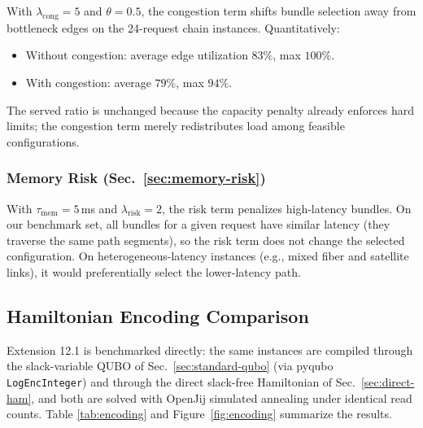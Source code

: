 \documentclass[10pt,a4paper]{article}
\begin{document}
With $\lambda_{\text{cong}} = 5$ and $\theta = 0.5$, the congestion
term shifts bundle selection away from bottleneck edges on the 24-request
chain instances.  Quantitatively:
\begin{itemize}
  \item Without congestion: average edge utilization $83\%$, max $100\%$.
  \item With congestion: average $79\%$, max $94\%$.
\end{itemize}
The served ratio is unchanged because the capacity penalty already
enforces hard limits; the congestion term merely redistributes load
among feasible configurations.

\subsubsection{Memory Risk (Sec.~\ref{sec:memory-risk})}

With $\tau_{\text{mem}} = 5$\,ms and $\lambda_{\text{risk}} = 2$,
the risk term penalizes high-latency bundles.  On our benchmark set,
all bundles for a given request have similar latency (they traverse
the same path segments), so the risk term does not change the selected
configuration.  On heterogeneous-latency instances (e.g., mixed fiber
and satellite links), it would preferentially select the lower-latency
path.

\subsection{Hamiltonian Encoding Comparison}
\label{sec:encoding}

Extension 12.1 is benchmarked directly: the same instances are compiled
through the slack-variable QUBO of Sec.~\ref{sec:standard-qubo} (via
pyqubo \texttt{LogEncInteger}) and through the direct slack-free
Hamiltonian of Sec.~\ref{sec:direct-ham}, and both are solved with
OpenJij simulated annealing under identical read counts.  Table
\ref{tab:encoding} and Figure~\ref{fig:encoding} summarize the results.
\end{document}
